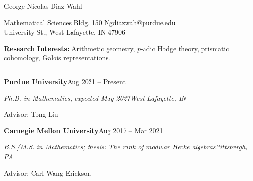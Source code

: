 \documentclass[11pt,letterpaper]{article}
\newcommand{\cvsection}[1]{\par\vspace{9pt}{\itshape #1}\par\vspace{1pt}\hrule\vspace{4pt}}
\newcommand{\entry}[4]{\par\vspace{4pt}\hspace*{10pt}\begin{minipage}{\dimexpr\linewidth-10pt}\textbf{#1}\hfill #2\par{\small\itshape #3\hfill #4}\end{minipage}\par}
\newcommand{\detail}[1]{\hspace*{10pt}\begin{minipage}{\dimexpr\linewidth-10pt}\small #1\end{minipage}\par}
\begin{document}
\begin{center}{\Large George Nicolas Diaz-Wahl}\end{center}
\vspace{2pt}
Mathematical Sciences Bldg. 150 N\hfill\href{mailto:gdiazwah@purdue.edu}{gdiazwah@purdue.edu}\\
University St., West Lafayette, IN 47906
\par\vspace{6pt}
{\small\textbf{Research Interests:} Arithmetic geometry, $p$-adic Hodge theory, prismatic cohomology, Galois representations.}

\cvsection{Education}
\entry{Purdue University}{Aug 2021 -- Present}{Ph.D. in Mathematics, expected May 2027}{West Lafayette, IN}
\detail{Advisor: Tong Liu}
\entry{Carnegie Mellon University}{Aug 2017 -- Mar 2021}{B.S./M.S. in Mathematics; thesis: The rank of modular Hecke algebras}{Pittsburgh, PA}
\detail{Advisor: Carl Wang-Erickson}
\end{document}
